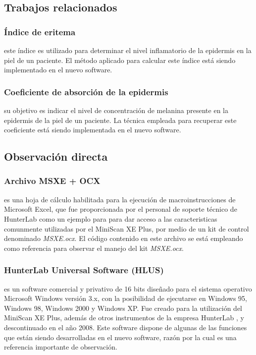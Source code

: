 \documentclass[conference]{IEEEtran}
\begin{document}
	\subsection{Trabajos relacionados}
		
		\subsubsection{\'{I}ndice de eritema}
		este \'{i}ndice es utilizado para determinar el nivel inflamatorio de la epidermis en la piel de un paciente. El m\'{e}todo aplicado para calcular este \'{i}ndice \cite{Wagner} est\'{a} siendo implementado en el nuevo software.
		
		\subsubsection{Coeficiente de absorci\'{o}n de la epidermis}
			 su objetivo es indicar el nivel de concentraci\'{o}n de melanina presente en la epidermis de la piel de un paciente. La t\'{e}cnica empleada para recuperar este coeficiente \cite{Narea} est\'{a} siendo implementada en el nuevo software.
	
	\subsection{Observaci\'{o}n directa}
		
		\subsubsection{Archivo MSXE + OCX}
		es una hoja de c\'{a}lculo habilitada para la ejecuci\'{o}n de macroinstrucciones de Microsoft Excel, que fue proporcionada por el personal de soporte t\'{e}cnico de HunterLab \cite{HunterLab} como un ejemplo para para dar acceso a las caracteristicas comunmente utilizadas por el MiniScan XE Plus, por medio de un kit de control denominado \textit{MSXE.ocx}. El c\'{o}digo contenido en este archivo se est\'{a} empleando como referencia para observar el manejo del kit \textit{MSXE.ocx}.
			
		\subsubsection{HunterLab Universal Software (HLUS)}
			es un software \mbox{comercial} y privativo de 16 bits dise\~{n}ado para el sistema \mbox{operativo} Microsoft Windows versi\'{o}n 3.x, con la posibilidad de ejecutarse en Windows 95, Windows 98, Windows 2000 y Windows XP. Fue creado para la utilizaci\'{o}n del \mbox{MiniScan} XE Plus, adem\'{a}s de otros instrumentos de la empresa \mbox{HunterLab} \cite{HunterLab-manual}, y descontinuado en el a\~{n}o 2008. Este software dispone de algunas de las funciones que est\'{a}n siendo desarrolladas en el nuevo software, raz\'{o}n por la cual es una referencia importante de observaci\'{o}n.
	
\end{document}
